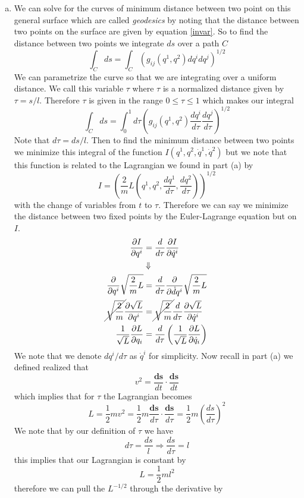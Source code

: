 \documentclass[11pt]{article}
\numberwithin{equation}{section}
\begin{document}
\begin{enumerate}[(a)]
\item We can solve for the curves of minimum distance between two point on this general 
surface which are called \emph{geodesics} by noting that the distance between two points on
the surface are given by equation \ref{invar}. So to find the distance between two points
we integrate $ds$ over a path $C$ 
$$\int_Cds = \int_C(g_{ij}(q^1,q^2)dq^idq^j)^{1/2}$$
We can parametrize the curve so that we are integrating over a uniform distance. We call this
variable $\tau$ where $\tau$ is a normalized distance given by $\tau = s/l$. Therefore 
$\tau$ is given in the range $0\le\tau\le{1}$ which makes our integral 
$$\int_Cds = \int_0^1d\tau\left(g_{ij}(q^1,q^2)\frac{dq^i}{d\tau}\frac{dq^j}{d\tau}\right)^{1/2}$$
Note that $d\tau = ds/l$. Then to find the minimum distance between two points we minimize 
this integral of the function $I(q^1,q^2,\dot{q}^1,\dot{q}^2)$ but we note that this function
is related to the Lagrangian we found in part (a) by
$$I = \left(\frac{2}{m}L\left(q^1,q^2,\frac{dq^1}{d\tau},\frac{dq^2}{d\tau}\right)\right)^{1/2}$$
with the change of variables from $t$ to $\tau$. Therefore we can say we minimize the 
distance between two fixed points by the Euler-Lagrange equation but on $I$.
\begin{align*} 
\frac{\partial I}{\partial q^i} &= \frac{d}{d\tau}\frac{\partial I}{\partial\dot{q}^i}\\
&\Downarrow\\
\frac{\partial}{\partial q^i}\sqrt{\frac{2}{m}L} &= \frac{d}{d\tau}\frac{\partial}{\partial\dot{d}q^i}\sqrt{\frac{2}{m}L}\\
\cancel{\sqrt{\frac{2}{m}}}\frac{\partial\sqrt{L}}{\partial q^i} &= \cancel{\sqrt{\frac{2}{m}}}\frac{d}{d\tau}\frac{\partial\sqrt{L}}{\partial\dot{q}^i}\\
\frac{1}{\sqrt{L}}\frac{\partial L}{\partial q_i} &= \frac{d}{d\tau}\left(\frac{1}{\sqrt{L}}\frac{\partial L}{\partial\dot{q}_i}\right)
\end{align*} 
We note that we denote $dq^i/d\tau$ as $\dot{q}^i$ for simplicity. Now recall in part (a) we
defined realized that
$$v^2 = \frac{\mathbf{ds}}{dt}\cdot\frac{\mathbf{ds}}{dt}$$
which implies that for $\tau$ the Lagrangian becomes
$$L = \frac{1}{2}mv^2 = \frac{1}{2}m\frac{\mathbf{ds}}{d\tau}\cdot\frac{\mathbf{ds}}{d\tau} = \frac{1}{2}m\left(\frac{ds}{d\tau}\right)^2$$
We note that by our definition of $\tau$ we have
$$d\tau = \frac{ds}{l} \Rightarrow \frac{ds}{d\tau} = l$$
this implies that our Lagrangian is constant by
$$L = \frac{1}{2}ml^2$$
therefore we can pull the $L^{-1/2}$ through the derivative by

\end{enumerate}
\end{document}
